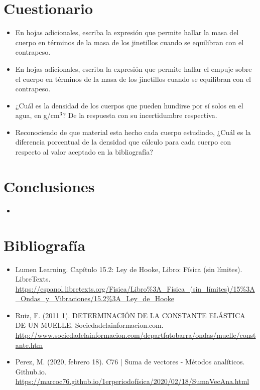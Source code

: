 \documentclass[10pt]{article}
\begin{document}
\section{Cuestionario}
\begin{itemize}
    \item En hojas adicionales, escriba la expresión que permite hallar la masa del cuerpo en términos de la masa de los jinetillos cuando se equilibran con el contrapeso.
    \item En hojas adicionales, escriba la expresión que permite hallar el empuje sobre el cuerpo en términos de la masa de los jinetillos cuando se equilibran con el contrapeso.
    \item ¿Cuál es la densidad de los cuerpos que pueden hundirse por sí solos en el agua, en g/cm$^{3}$? De la respuesta con su incertidumbre respectiva.
    \item Reconociendo de que material esta hecho cada cuerpo estudiado, ¿Cuál es la diferencia porcentual de la densidad que cálculo para cada cuerpo con respecto al valor aceptado en la bibliografía?    
\end{itemize}

\section{Conclusiones}
\begin{itemize}
    \item
\end{itemize}

\section{Bibliografía}
\begin{itemize}
\item Lumen Learning. Capítulo 15.2: Ley de Hooke, Libro: Física (sin límites). LibreTexts.\\ \url{https://espanol.libretexts.org/Fisica/Libro\%3A_Física_(sin_límites)/15\%3A_Ondas_y_Vibraciones/15.2\%3A_Ley_de_Hooke}
\item Ruiz, F. (2011 1). DETERMINACIÓN DE LA CONSTANTE ELÁSTICA DE UN MUELLE. Sociedadelainformacion.com. \url{http://www.sociedadelainformacion.com/departfqtobarra/ondas/muelle/constante.htm}

\item Perez, M. (2020, febrero 18). C76 | Suma de vectores - Métodos analíticos. Github.io. \url{https://marcoc76.github.io/1erperiodofísica/2020/02/18/SumaVecAna.html}

\end{itemize}
\end{document}
